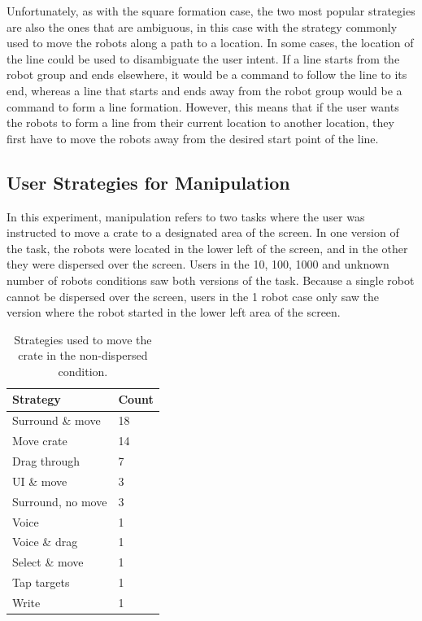 Unfortunately, as with the square formation case, the two most popular strategies are also the ones that are ambiguous, in this case with the strategy commonly used to move the robots along a path to a location. 
In some cases, the location of the line could be used to disambiguate the user intent. 
If a line starts from the robot group and ends elsewhere, it would be a command to follow the line to its end, whereas a line that starts and ends away from the robot group would be a command to form a line formation. 
However, this means that if the user wants the robots to form a line from their current location to another location, they first have to move the robots away from the desired start point of the line. 

\subsection{User Strategies for Manipulation}

In this experiment, manipulation refers to two tasks where the user was instructed to move a crate to a designated area of the screen. 
In one version of the task, the robots were located in the lower left of the screen, and in the other they were dispersed over the screen. 
Users in the 10, 100, 1000 and unknown number of robots conditions saw both versions of the task. 
Because a single robot cannot be dispersed over the screen, users in the 1 robot case only saw the version where the robot started in the lower left area of the screen. 

\begin{table}
	\begin{tabular}{l l}
		Strategy & Count\\
		\hline
		Surround \& move & 18\\
		Move crate & 14\\
		Drag through & 7\\
		UI \& move & 3\\
		Surround, no move & 3\\
		Voice & 1\\
		Voice \& drag & 1\\
		Select \& move & 1 \\
		Tap targets & 1\\
		Write & 1\\
	\end{tabular}
	\caption{Strategies used to move the crate in the non-dispersed condition.}
	\label{tab:crate_strategies}
\end{table}


